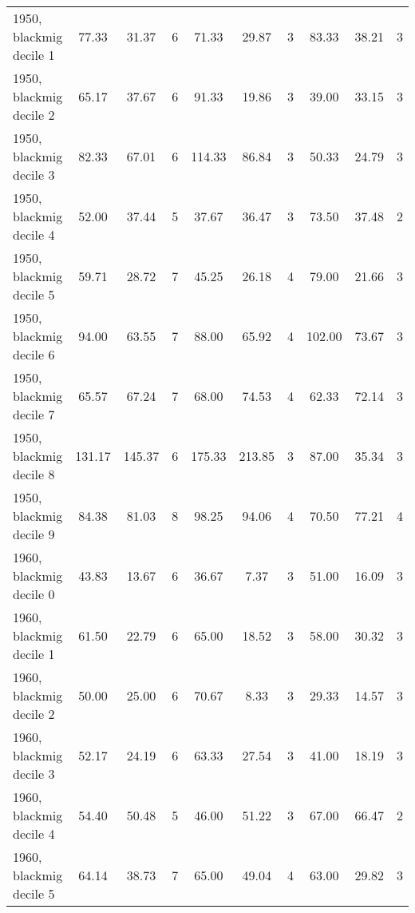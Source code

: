 \begin{table}[htbp]
\begin{tabular}{l*{3}{ccc}}
1950, blackmig decile 1&       77.33&       31.37&           6&       71.33&       29.87&           3&       83.33&       38.21&           3\\
1950, blackmig decile 2&       65.17&       37.67&           6&       91.33&       19.86&           3&       39.00&       33.15&           3\\
1950, blackmig decile 3&       82.33&       67.01&           6&      114.33&       86.84&           3&       50.33&       24.79&           3\\
1950, blackmig decile 4&       52.00&       37.44&           5&       37.67&       36.47&           3&       73.50&       37.48&           2\\
1950, blackmig decile 5&       59.71&       28.72&           7&       45.25&       26.18&           4&       79.00&       21.66&           3\\
1950, blackmig decile 6&       94.00&       63.55&           7&       88.00&       65.92&           4&      102.00&       73.67&           3\\
1950, blackmig decile 7&       65.57&       67.24&           7&       68.00&       74.53&           4&       62.33&       72.14&           3\\
1950, blackmig decile 8&      131.17&      145.37&           6&      175.33&      213.85&           3&       87.00&       35.34&           3\\
1950, blackmig decile 9&       84.38&       81.03&           8&       98.25&       94.06&           4&       70.50&       77.21&           4\\
1960, blackmig decile 0&       43.83&       13.67&           6&       36.67&        7.37&           3&       51.00&       16.09&           3\\
1960, blackmig decile 1&       61.50&       22.79&           6&       65.00&       18.52&           3&       58.00&       30.32&           3\\
1960, blackmig decile 2&       50.00&       25.00&           6&       70.67&        8.33&           3&       29.33&       14.57&           3\\
1960, blackmig decile 3&       52.17&       24.19&           6&       63.33&       27.54&           3&       41.00&       18.19&           3\\
1960, blackmig decile 4&       54.40&       50.48&           5&       46.00&       51.22&           3&       67.00&       66.47&           2\\
1960, blackmig decile 5&       64.14&       38.73&           7&       65.00&       49.04&           4&       63.00&       29.82&           3\\

\end{tabular}
\end{table}

